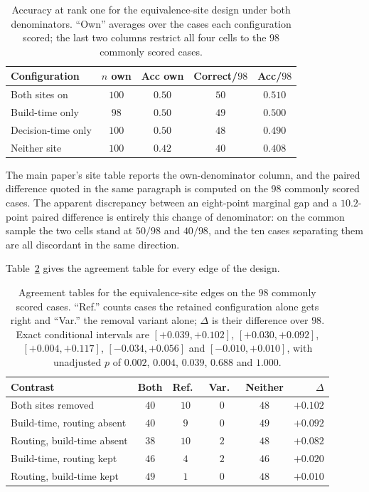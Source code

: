\documentclass[letterpaper]{article}
\begin{document}
\begin{table}[tb]
\centering
\footnotesize
\setlength{\tabcolsep}{4pt}
\begin{tabular}{@{}lcccc@{}}
\toprule
Configuration & $n$ own & Acc own & Correct/$98$ & Acc/$98$ \\
\midrule
Both sites on       & $100$ & $0.50$ & $50$ & $0.510$ \\
Build-time only     & $98$  & $0.50$ & $49$ & $0.500$ \\
Decision-time only  & $100$ & $0.50$ & $48$ & $0.490$ \\
Neither site        & $100$ & $0.42$ & $40$ & $0.408$ \\
\bottomrule
\end{tabular}
\caption{Accuracy at rank one for the equivalence-site design under both denominators. ``Own'' averages over the cases each configuration scored; the last two columns restrict all four cells to the $98$ commonly scored cases.}
\label{tab:rec-eq-marg}
\end{table}

The main paper's site table reports the own-denominator column, and the paired difference quoted in the same paragraph is computed on the $98$ commonly scored cases.
The apparent discrepancy between an eight-point marginal gap and a $10.2$-point paired difference is entirely this change of denominator: on the common sample the two cells stand at $50/98$ and $40/98$, and the ten cases separating them are all discordant in the same direction.

Table~\ref{tab:rec-eq-cell} gives the agreement table for every edge of the design.

\begin{table}[tb]
\centering
\footnotesize
\setlength{\tabcolsep}{2.5pt}
\begin{tabular}{@{}lccccr@{}}
\toprule
Contrast & Both & Ref.\ & Var.\ & Neither & $\Delta$ \\
\midrule
Both sites removed        & $40$ & $10$ & $0$ & $48$ & $+0.102$ \\
Build-time, routing absent & $40$ & $9$  & $0$ & $49$ & $+0.092$ \\
Routing, build-time absent & $38$ & $10$ & $2$ & $48$ & $+0.082$ \\
Build-time, routing kept   & $46$ & $4$  & $2$ & $46$ & $+0.020$ \\
Routing, build-time kept   & $49$ & $1$  & $0$ & $48$ & $+0.010$ \\
\bottomrule
\end{tabular}
\caption{Agreement tables for the equivalence-site edges on the $98$ commonly scored cases. ``Ref.'' counts cases the retained configuration alone gets right and ``Var.'' the removal variant alone; $\Delta$ is their difference over $98$. Exact conditional intervals are $[+0.039,+0.102]$, $[+0.030,+0.092]$, $[+0.004,+0.117]$, $[-0.034,+0.056]$ and $[-0.010,+0.010]$, with unadjusted $p$ of $0.002$, $0.004$, $0.039$, $0.688$ and $1.000$.}
\label{tab:rec-eq-cell}
\end{table}
\end{document}
